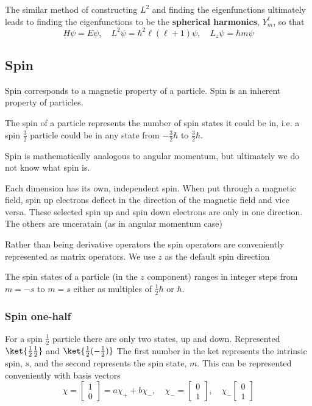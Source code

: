 The similar method of constructing $ L^2 $ and finding the eigenfunctions ultimately leads to finding the eigenfunctions to be the \textbf{spherical harmonics}, $ Y_{m}^{\ell} $, so that
\begin{equation}
  H\psi=E\psi,\quad L^2\psi=\hbar^2\ell(\ell+1)\psi,\quad L_{z}\psi=\hbar m\psi
\end{equation}


\subsection{Spin}
Spin corresponds to a magnetic property of a particle.
Spin is an inherent property of particles.

The spin of a particle represents the number of spin states it could be in, i.e. a spin $ \frac{3}{2} $ particle could be in any state from $ -\frac{3}{2}\hbar $ to $ \frac{3}{2}\hbar $. 

Spin is mathematically analogous to angular momentum, but ultimately we do not know what spin is.

Each dimension has its own, independent spin. When put through a magnetic field, spin up electrons deflect in the direction of the magnetic field and vice versa. These selected spin up and spin down electrons are only in one direction. The others are unceratain (as in angular momentum case)

Rather than being derivative operators the spin operators are conveniently represented as matrix operators. We use $ z $ as the default spin direction

The spin states of a particle (in the $ z $ component) ranges in integer steps from $ m=-s $ to $ m=s $ either as multiples of $ \frac{1}{2}\hbar $ or $ \hbar $.

\subsubsection{Spin one-half}
For a spin $ \frac{1}{2} $ particle there are only two states, up and down. Represented $ \ket{\frac{1}{2}\frac{1}{2}} $ and $ \ket{\frac{1}{2}(- \frac{1}{2})} $ The first number in the ket represents the intrinsic spin, $ s $, and the second represents the spin state, $ m $. This can be represented conveniently with basis vectors
\begin{equation}
  \chi = \begin{bmatrix}
  1\\0
  \end{bmatrix} = a\chi_{+}+b\chi_{-},\quad \chi_{-}=\begin{bmatrix}
  0\\1
  \end{bmatrix},\quad\chi_{-}\begin{bmatrix}
  0\\1
  \end{bmatrix}
\end{equation}








